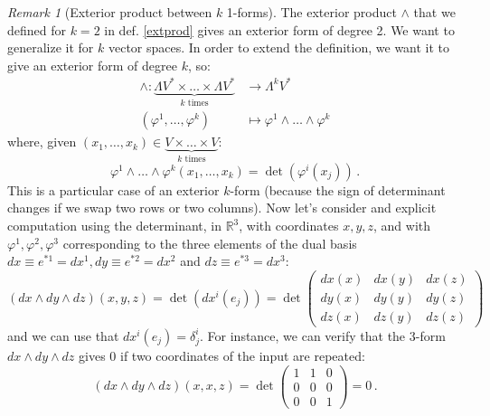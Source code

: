 \documentclass[a4paper,11pt,titlepage, article, oneside]{memoir}
\numberwithin{equation}{section}
\theoremstyle{definition}
\theoremstyle{remark}
\newtheorem{remark}[theorem]{Remark}
\newcommand{\rfield}{\mathbb{R}}
\begin{document}
\begin{remarkbox}\begin{remark}[Exterior product between $k$ 1-forms]
The exterior product $\wedge$ that we defined for $k=2$ in def. \ref{extprod} gives an exterior form of degree 2. We want to generalize it for $k$ vector spaces. In order to extend the definition, we want it to give an exterior form of degree $k$, so:
\begin{align*}
  \wedge \colon \underbrace{\Lambda V^* \times \ldots \times \Lambda V^*}_{k \text{ times}} &\rightarrow \Lambda^k V^*  \\
  (\varphi^1, \ldots, \varphi^k) &\mapsto \varphi^1 \wedge \ldots \wedge \varphi^k
\end{align*}
where, given $(x_1, \ldots, x_k) \in \underbrace{V \times \ldots \times V}_{k \text{ times}}$:
\begin{equation} \label{detformula}
  \varphi^1 \wedge \ldots \wedge \varphi^k (x_1, \ldots, x_k) =  \det\left (\varphi^i(x_j) \right) \, .
\end{equation}
This is a particular case of an exterior $k$-form (because the sign of determinant changes if we swap two rows or two columns).
Now let's consider and explicit computation using the determinant, in $\rfield^3$, with coordinates $x, y, z$, and with $\varphi^1, \varphi^2, \varphi^3$ corresponding to the three elements of the dual basis $dx \equiv e^{*1} = dx^1, dy \equiv e^{*2} = dx^2$ and $ dz \equiv e^{*3} = dx^3$:
\begin{equation*}
(dx \wedge dy \wedge dz)(x, y, z) = \det\left (dx^i(e_j) \right) = \det \left( 
\begin{matrix}
dx(x) & dx(y) & dx(z) \\
dy(x) & dy(y) & dy(z) \\
dz(x) & dz(y) & dz(z)
\end{matrix}
\right )
\end{equation*}
and we can use that $dx^i(e_j) = \delta^i_j$. For instance, we can verify that the 3-form $dx \wedge dy \wedge dz$ gives 0 if two coordinates of the input are repeated:
\begin{equation*}
(dx \wedge dy \wedge dz)(x, x, z) = \det \left( 
\begin{matrix}
1 & 1 & 0 \\
0 & 0 & 0 \\
0 & 0 & 1
\end{matrix}
\right ) = 0 \, .
\end{equation*}
\end{remark}\end{remarkbox}
\end{document}
